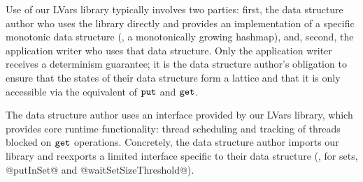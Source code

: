 Use of our LVars library typically involves two parties: first, the data
structure author who uses the library directly and provides an
implementation of a specific monotonic data structure (\eg, a
monotonically growing hashmap), and, second, the application writer
who uses that data structure.  Only the application writer receives a
determinism guarantee; it is the data structure author's obligation to ensure
that the states of their data structure form a lattice and that it is only accessible via
the equivalent of $\mbox{\texttt{put}}$ and $\mbox{\texttt{get}}$.

The data structure author uses an interface provided by our LVars library,
which provides core runtime functionality: thread scheduling and
tracking of threads blocked on $\mbox{\texttt{get}}$ operations.
Concretely, 
the data structure author
imports our library
and reexports a limited interface specific to their data structure 
(\eg{}, for sets, @putInSet@ and @waitSetSizeThreshold@).  

